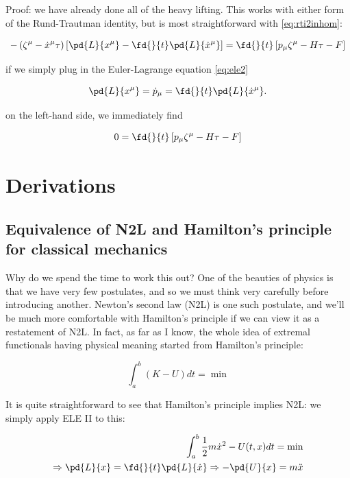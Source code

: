 \documentclass[12pt]{article}
\newcommand{\coord}{x}
\newcommand{\xd}{\dot{\coord}}
\newcommand{\xmu}{\coord^\mu}
\newcommand{\xdmu}{\xd^\mu}
\newcommand{\pdmu}{\dot{p}_\mu}
\numberwithin{equation}{section}
\begin{document}
Proof: we have already done all of the heavy lifting. This works with
either form of the Rund-Trautman identity, but is most straightforward with \ref{eq:rti2inhom}:

\begin{equation}
  -\left( \zeta^\mu - \xdmu\tau \right)\left[ \pd{L}{\xmu} - \fd{}{t}\pd{L}{\xdmu}  \right]
    = \fd{}{t}\left[ p_\mu\zeta^\mu - H\tau  - F\right]
\end{equation}

if we simply plug in the Euler-Lagrange equation \ref{eq:ele2}

\begin{equation*}
  \pd{L}{\xmu} = \pdmu = \fd{}{t}\pd{L}{\xdmu}.
\end{equation*}

on the left-hand side, we immediately find 

\begin{equation*}
   0 = \fd{}{t}\left[ p_\mu\zeta^\mu - H\tau  - F\right]
\end{equation*}

\newpage

\section{Derivations}

\newpage

\subsection{Equivalence of N2L and Hamilton's principle for classical mechanics}
\label{sec:n2l-ham}

Why do we spend the time to work this out? One of the beauties of physics is that we have very few postulates, and so we must think very carefully before introducing another. Newton's second law (N2L) is one such postulate, and we'll be much more comfortable with Hamilton's principle if we can view it as a restatement of N2L. In fact, as far as I know, the whole idea of extremal functionals having physical meaning started from Hamilton's principle:

\begin{equation}
  \label{eq:ham}
  \int_a^b(K-U)dt = \min
\end{equation}

It is quite straightforward to see that Hamilton's principle implies N2L: we simply apply ELE II to this:

\begin{eqnarray*}
  \int_a^b\frac{1}{2}m\dot{x}^2 -U(t,x)dt = \min \\
  \Rightarrow \pd{L}{x} = \fd{}{t}\pd{L}{\dot{x}} \Rightarrow -\pd{U}{x} = m\ddot{x}
\end{eqnarray*}
\end{document}
